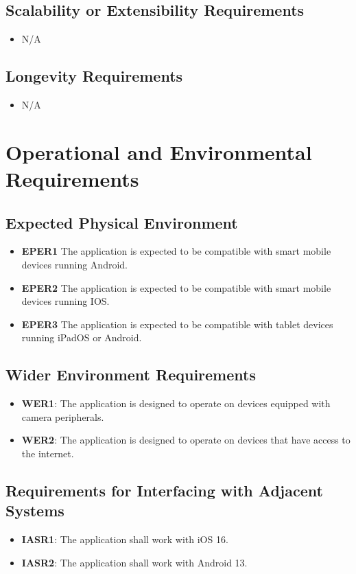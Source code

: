 \documentclass[12pt]{article}
\begin{document}
\subsection{Scalability or Extensibility Requirements}
\begin{itemize}
  \item N/A
\end{itemize}
\subsection{Longevity Requirements}
\begin{itemize}
  \item N/A
\end{itemize}

\section{Operational and Environmental Requirements}
\subsection{Expected Physical Environment}
\begin{itemize}
    \item \textbf{EPER1} The application is expected to be compatible with smart mobile devices running Android.
    \item \textbf{EPER2} The application is expected to be compatible with smart mobile devices running IOS.
    \item \textbf{EPER3} The application is expected to be compatible with tablet devices running iPadOS or Android. 
\end{itemize}
\subsection{Wider Environment Requirements}
\begin{itemize}
    \item \textbf{WER1}: The application is designed to operate on devices equipped with camera peripherals.
    \item \textbf{WER2}: The application is designed to operate on devices that have access to the internet. 
\end{itemize}
\subsection{Requirements for Interfacing with Adjacent Systems}
\begin{itemize}
    \item \textbf{IASR1}: The application shall work with iOS 16.
    \item \textbf{IASR2}: The application shall work with Android 13.
\end{itemize}
\end{document}
